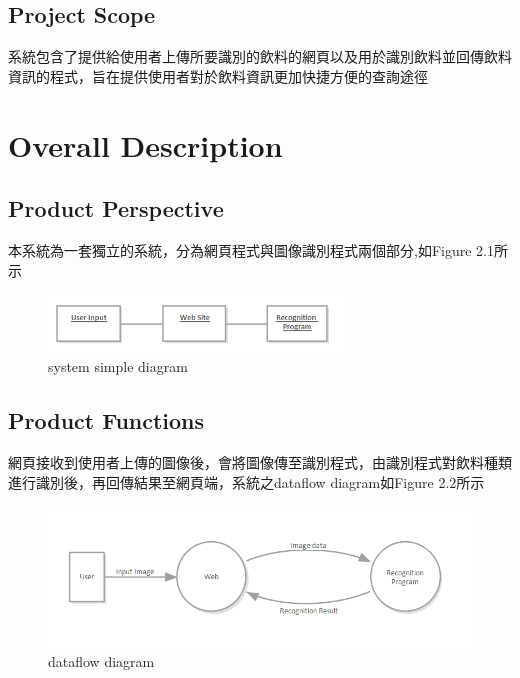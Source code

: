 \documentclass{scrreprt}
\begin{document}
\begin{CJK}{UTF8}{bkai}
\section{Project Scope}
系統包含了提供給使用者上傳所要識別的飲料的網頁以及用於識別飲料並回傳飲料資訊的程式，旨在提供使用者對於飲料資訊更加快捷方便的查詢途徑


\chapter{Overall Description}

\section{Product Perspective}
本系統為一套獨立的系統，分為網頁程式與圖像識別程式兩個部分,如Figure 2.1所示

\begin{figure}[ht]
\begin{center}
\includegraphics[width=8cm]{diagram1.png}
\end{center}
\caption{system simple diagram}
\label{fig:1}
\end{figure}

\section{Product Functions}
網頁接收到使用者上傳的圖像後，會將圖像傳至識別程式，由識別程式對飲料種類進行識別後，再回傳結果至網頁端，系統之dataflow diagram如Figure 2.2所示
\begin{figure}[ht]
\begin{center}
\includegraphics[width=14cm]{diagram2.png}
\end{center}
\caption{dataflow diagram}
\label{fig:1}
\end{figure}



\end{CJK}
\end{document}
